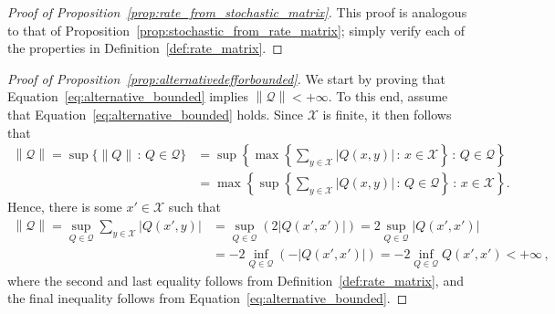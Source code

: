\documentclass[10pt,a4paper]{paper}
\theoremstyle{definition}
\newcommand{\states}{\mathcal{X}}
\newcommand{\rateset}{\mathcal{Q}}
\newcommand{\norm}[1]{\left\lVert #1 \right\rVert}
\newcommand{\abs}[1]{\left\vert #1 \right\vert}
\newcommand{\coloneqq}{:\!=}
\begin{document}
\begin{proof}[Proof of Proposition~\ref{prop:rate_from_stochastic_matrix}]
This proof is analogous to that of Proposition~\ref{prop:stochastic_from_rate_matrix}; simply verify each of the properties in Definition~\ref{def:rate_matrix}.
\end{proof}

\begin{proof}[Proof of Proposition~\ref{prop:alternativedefforbounded}]
We start by proving that Equation~\eqref{eq:alternative_bounded} implies $\norm{\rateset}<+\infty$. %
 To this end, assume that Equation~\eqref{eq:alternative_bounded} holds. Since $\states$ is finite, it then follows that
\begin{align*}
\norm{\rateset} = \sup\{\norm{Q}\,:\,Q\in\rateset\}
 &= \sup\left\{\max\left\{\sum_{y\in\states}\abs{Q(x,y)}\,:\,x\in\states\right\}\,:\,Q\in\rateset\right\} \\
 &= \max\left\{\sup\left\{\sum_{y\in\states}\abs{Q(x,y)}\,:\,Q\in\rateset\right\} \,:\,x\in\states\right\}.
\end{align*}Hence, there is some $x'\in\states$ such that
\begin{align*}
\norm{\rateset} = \sup_{Q\in\rateset}\sum_{y\in\states}\abs{Q(x',y)}
&=\sup_{Q\in\rateset}\left(2\abs{Q(x',x')}\right)
 = 2\sup_{Q\in\rateset}\abs{Q(x',x')}\\
 &= -2\inf_{Q\in\rateset}\left(-\abs{Q(x',x')}\right)
 = -2\inf_{Q\in\rateset}Q(x',x')< +\infty\,,
\end{align*}
where the second and last equality follows from Definition~\ref{def:rate_matrix}, and the final inequality follows from Equation~\eqref{eq:alternative_bounded}.


\end{proof}
\end{document}
